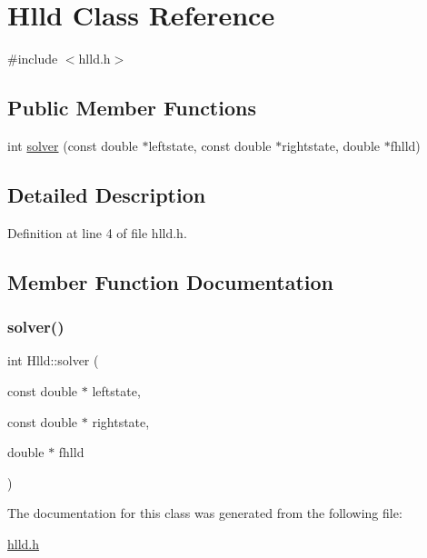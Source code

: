 \hypertarget{classHlld}{}\section{Hlld Class Reference}
\label{classHlld}


{\ttfamily \#include $<$hlld.\+h$>$}

\subsection*{Public Member Functions}
\begin{DoxyCompactItemize}
\item 
int \hyperlink{classHlld_a3a55723de46752f0767011b0b542d160}{solver} (const double $\ast$leftstate, const double $\ast$rightstate, double $\ast$fhlld)
\end{DoxyCompactItemize}


\subsection{Detailed Description}


Definition at line 4 of file hlld.\+h.



\subsection{Member Function Documentation}
\mbox{\label{classHlld_a3a55723de46752f0767011b0b542d160}} 
\subsubsection{\texorpdfstring{solver()}{solver()}}
{\footnotesize\ttfamily int Hlld\+::solver (\begin{DoxyParamCaption}\item[{const double $\ast$}]{leftstate,  }\item[{const double $\ast$}]{rightstate,  }\item[{double $\ast$}]{fhlld }\end{DoxyParamCaption})}



The documentation for this class was generated from the following file\+:\begin{DoxyCompactItemize}
\item 
\hyperlink{hlld_8h}{hlld.\+h}\end{DoxyCompactItemize}
